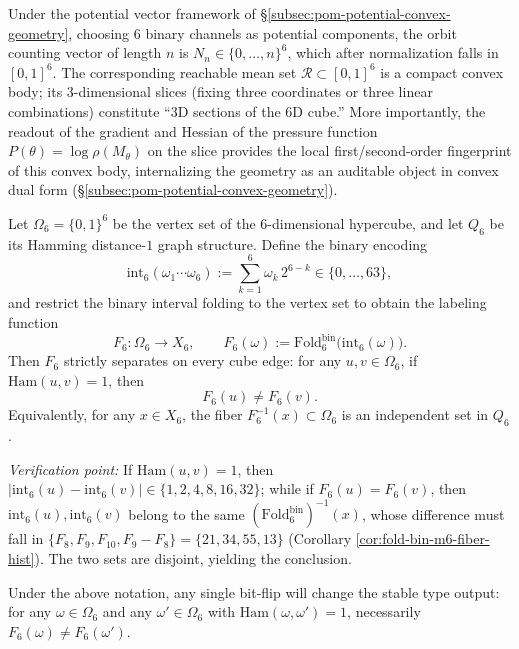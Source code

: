 \begin{enumerate}
  \begin{proposition}
  \label{prop:terminal-6d-reachable-mean-convex-body}
  Under the potential vector framework of \S\ref{subsec:pom-potential-convex-geometry}, choosing \(6\) binary channels as potential components, the orbit counting vector of length \(n\) is
  \(N_n\in\{0,\dots,n\}^6\), which after normalization falls in \([0,1]^6\).
  The corresponding reachable mean set \(\mathcal{R}\subset[0,1]^6\) is a compact convex body; its \(3\)-dimensional slices (fixing three coordinates or three linear combinations) constitute ``3D sections of the 6D cube.''
  More importantly, the readout of the gradient and Hessian of the pressure function \(P(\theta)=\log\rho(M_\theta)\) on the slice provides the local first/second-order fingerprint of this convex body, internalizing the geometry as an auditable object in convex dual form (\S\ref{subsec:pom-potential-convex-geometry}).
  \end{proposition}

  \begin{theorem}\label{thm:terminal-foldbin6-cube-edge-separation}
  Let \(\Omega_6=\{0,1\}^6\) be the vertex set of the \(6\)-dimensional hypercube, and let \(Q_6\) be its Hamming distance-\(1\) graph structure.
  Define the binary encoding
  \[
  \mathrm{int}_6(\omega_1\cdots\omega_6):=\sum_{k=1}^6 \omega_k\,2^{6-k}\in\{0,\dots,63\},
  \]
  and restrict the binary interval folding to the vertex set to obtain the labeling function
  \[
  F_6:\Omega_6\to X_6,\qquad F_6(\omega):=\mathrm{Fold}^{\mathrm{bin}}_6\bigl(\mathrm{int}_6(\omega)\bigr).
  \]
  Then \(F_6\) strictly separates on every cube edge: for any \(u,v\in\Omega_6\), if \(\mathrm{Ham}(u,v)=1\), then
  \[
  F_6(u)\neq F_6(v).
  \]
  Equivalently, for any \(x\in X_6\), the fiber \(F_6^{-1}(x)\subset\Omega_6\) is an independent set in \(Q_6\).
  \end{theorem}
  \emph{Verification point:} If \(\mathrm{Ham}(u,v)=1\), then \(|\mathrm{int}_6(u)-\mathrm{int}_6(v)|\in\{1,2,4,8,16,32\}\);
  while if \(F_6(u)=F_6(v)\), then \(\mathrm{int}_6(u),\mathrm{int}_6(v)\) belong to the same \((\mathrm{Fold}^{\mathrm{bin}}_6)^{-1}(x)\), whose difference must fall in
  \(\{F_8,F_9,F_{10},F_9-F_8\}=\{21,34,55,13\}\) (Corollary \ref{cor:fold-bin-m6-fiber-hist}). The two sets are disjoint, yielding the conclusion.

  \begin{corollary}\label{cor:terminal-foldbin6-onebit-error-detecting}
  Under the above notation, any single bit-flip will change the stable type output:
  for any \(\omega\in\Omega_6\) and any \(\omega'\in\Omega_6\) with \(\mathrm{Ham}(\omega,\omega')=1\), necessarily
  \(F_6(\omega)\neq F_6(\omega')\).
  \end{corollary}


\end{enumerate}
